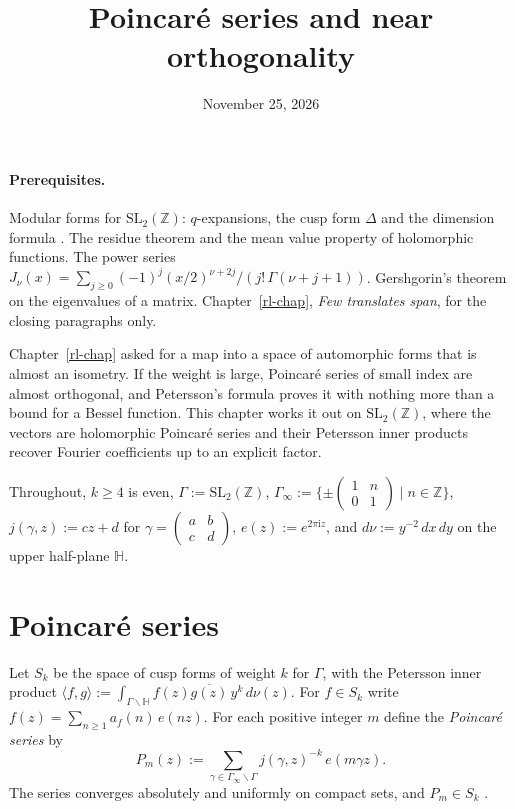 \documentclass[reqno]{amsart}
\title{Poincar\'e series and near orthogonality}
\author{}
\date{November 25, 2026}
\newcounter{chap}
\theoremstyle{definition}
\theoremstyle{plain}
\newcommand{\Z}{\mathbb{Z}}
\newcommand{\HH}{\mathbb{H}}
\newcommand{\ii}{\mathrm{i}}
\begin{document}
\maketitle
{}\label{chap}

\paragraph{Prerequisites.}
Modular forms for \(\mathrm{SL}_2(\Z)\): \(q\)-expansions, the cusp form \(\Delta\) and the dimension formula \cite[Ch.~VII, \S3]{SeA}.  The residue theorem and the mean value property of holomorphic functions.  The power series \(J_\nu(x) = \sum_{j \ge 0} (-1)^j (x/2)^{\nu + 2j}/(j!\,\Gamma(\nu + j + 1))\).  Gershgorin's theorem on the eigenvalues of a matrix.  Chapter~\ref{rl-chap}, \emph{Few translates span}, for the closing paragraphs only.

Chapter~\ref{rl-chap} asked for a map into a space of automorphic forms that is almost an isometry.  If the weight is large, Poincar\'e series of small index are almost orthogonal, and Petersson's formula proves it with nothing more than a bound for a Bessel function.  This chapter works it out on \(\mathrm{SL}_2(\Z)\), where the vectors are holomorphic Poincar\'e series and their Petersson inner products recover Fourier coefficients up to an explicit factor.

Throughout, \(k \ge 4\) is even, \(\Gamma := \mathrm{SL}_2(\Z)\), \(\Gamma_\infty := \{\pm\begin{pmatrix}1 & n\\ 0 & 1\end{pmatrix} \mid n\in\Z\}\), \(j(\gamma,z) := cz + d\) for \(\gamma = \begin{pmatrix}a & b\\ c & d\end{pmatrix}\), \(e(z) := e^{2\pi\ii z}\), and \(d\nu := y^{-2}\,dx\,dy\) on the upper half-plane \(\HH\).

\section{Poincar\'e series}\label{sec:poincare}

Let \(S_k\) be the space of cusp forms of weight \(k\) for \(\Gamma\), with the Petersson inner product \(\langle f, g\rangle := \int_{\Gamma\backslash\HH} f(z)\overline{g(z)}\,y^k\,d\nu(z)\).  For \(f \in S_k\) write \(f(z) = \sum_{n \ge 1} a_f(n)\,e(nz)\).  For each positive integer \(m\) define the \emph{Poincar\'e series} by
\[
  P_m(z) := \sum_{\gamma \in \Gamma_\infty\backslash\Gamma} j(\gamma,z)^{-k}\, e(m\gamma z) .
\]
The series converges absolutely and uniformly on compact sets, and \(P_m \in S_k\) \cite[\S\S3.1--3.2]{Iw}.
\end{document}
